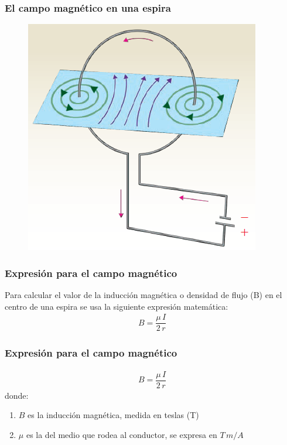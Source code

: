 \documentclass[14pt]{beamer}
\begin{document}
\begin{frame}
\frametitle{El campo magnético en una espira}
\begin{figure}
    \centering
    \includegraphics[scale=0.6]{Imagenes/Electromagnetismo_07.png}
\end{figure}
\end{frame}
\begin{frame}
\frametitle{Expresión para el campo magnético}
Para calcular el valor de la inducción magnética o densidad de flujo (B) en el centro de una espira se usa la siguiente expresión matemática:
\pause
\begin{align*}
B = \dfrac{\mu \, I}{2 \, r}
\end{align*}
\end{frame}
\begin{frame}
\frametitle{Expresión para el campo magnético}
\begin{align*}
B = \dfrac{\mu \, I}{2 \, r}
\end{align*}    
donde:
\begin{enumerate}[<+->]
\item $B$ es la inducción magnética, medida en teslas (T)
\item $\mu$ es la  del medio que rodea al conductor, se expresa en $T \, m/A$
\seti
\end{enumerate}
\end{frame}
\end{document}
